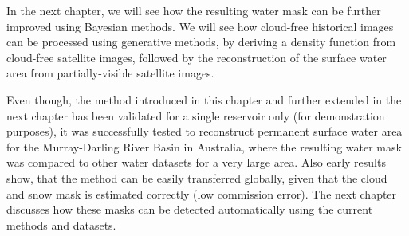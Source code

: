 In the next chapter, we will see how the resulting water mask can be further improved using Bayesian methods. We will see how cloud-free historical images can be processed using generative methods, by deriving a density function from cloud-free satellite images, followed by the reconstruction of the surface water area from partially-visible satellite images.

Even though, the method introduced in this chapter and further extended in the next chapter has been validated for a single reservoir only (for demonstration purposes), it was successfully tested to reconstruct permanent surface water area for the Murray-Darling River Basin in Australia, where the resulting water mask was compared to other water datasets for a very large area. Also early results show, that the method can be easily transferred globally, given that the cloud and snow mask is estimated correctly (low commission error). The next chapter discusses how these masks can be detected automatically using the current methods and datasets.


